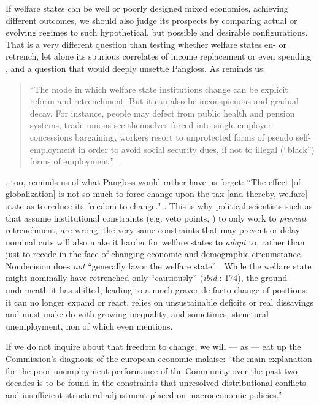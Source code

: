 \documentclass[11pt,a4paper,oneside,openright]{article}
\begin{document}
If welfare states can be well or poorly designed mixed economies, achieving different outcomes, we should also judge its prospects by comparing actual or evolving regimes to such hypothetical, but possible and desirable configurations. 
That is a very different question than testing whether welfare states en- or retrench, let alone its spurious correlates of income replacement \citep{Swank-2005-aa} or even spending \citep[24]{Kleinman2002}, and a question that would deeply unsettle Pangloss. 
As \citeauthor{Offe2003} reminds us:
	\begin{quote}
		``The mode in which welfare state institutions change can be explicit reform and retrenchment. 
		But it can also be inconspicuous and gradual decay. 
		For instance, people may defect from public health and pension systems, trade unions see themselves forced into single-employer concessions bargaining, workers resort to unprotected forms of pseudo self-employment in order to avoid social security dues, if not to illegal (“black”) forms of employment.'' \citeyearpar[364]{Offe2003}.
	\end{quote}
\citeauthor{Genschel2005}, too, reminds us of what Pangloss would rather have us forget: 
``The effect [of globalization] is not so much to force change upon the tax [and thereby, welfare] state as to reduce its freedom to change." \citeyearpar[53]{Genschel2005}. 
This is  why political scientists such as \cite{Pierson2002,Pierson1996} that assume institutional constraints (e.g. veto points, \citealt{Tsebelis-2002-aa}) to only work to \emph{prevent} retrenchment, are wrong: 
the very same constraints that may prevent or delay nominal cuts will also make it harder for welfare states to \emph{adapt} to, rather than just to recede in the face of changing economic and demographic circumstance. 
Nondecision does \emph{not} ``generally favor the welfare state'' \citep[174]{Pierson1996}. While the welfare state might nominally have retrenched only ``cautiously'' (\emph{ibid.}: 174), the ground underneath it has shifted, leading to a much graver de-facto change of positions: 
it can no longer expand or react, relies on unsustainable deficits or real dissavings and must make do with growing inequality, and sometimes, structural unemployment, non of which \citeauthor{Pierson1996} even mentions.

If we do not inquire about that freedom to change, we will --- as \citep[99]{Kleinman2002} --- eat up the Commission's diagnosis of the european economic malaise: 
``the main explanation for the poor unemployment performance of the Community over the past two decades is to be found in the constraints that unresolved distributional conflicts and insufficient structural adjustment placed on macroeconomic policies.''
\end{document}
